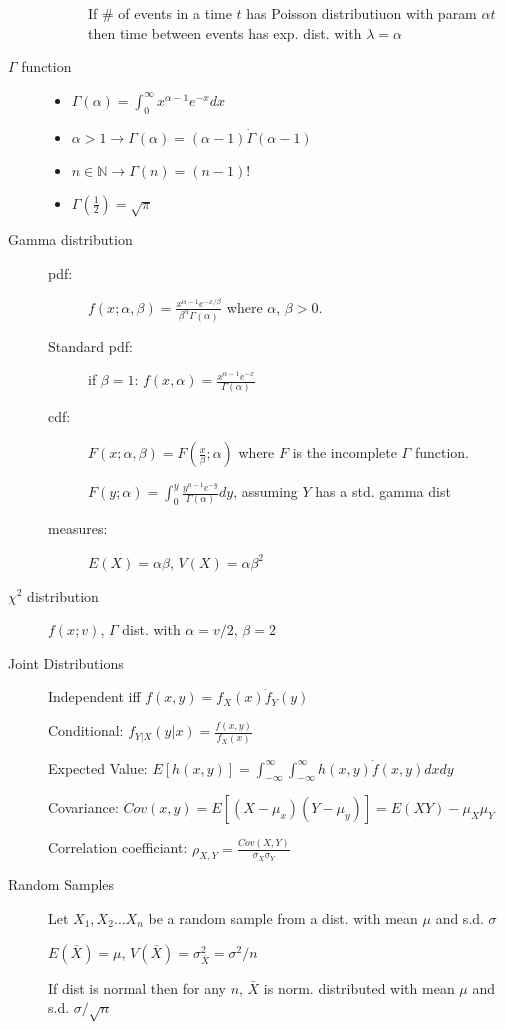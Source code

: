 \documentclass[12pt]{letter}
\begin{document}
\begin{multicols}{2}
\begin{description}
\begin{description}
        If \# of events in a time $t$ has Poisson distributiuon with param $\alpha t$ then time between events has exp. dist. with $\lambda = \alpha$
    \end{description}
  \item[$\Gamma$ function]
    \begin{itemize}
    \item $\Gamma (\alpha) = \int_0^\infty x^{\alpha - 1}e^{-x}dx$ 
    \item $\alpha > 1 \rightarrow \Gamma(\alpha) = (\alpha - 1)\dot\Gamma(\alpha - 1)$
    \item $n \in \mathbb{N} \rightarrow \Gamma(n) = (n - 1)!$
    \item $\Gamma(\frac{1}{2}) = \sqrt{\pi}$
    \end{itemize}
  \item[Gamma distribution]
    \begin{description}
    \item[pdf:] $f(x; \alpha, \beta) = \frac{x^{\alpha - 1}e^{-x/\beta}}{\beta^\alpha \Gamma(\alpha)}$ where $\alpha$, $\beta > 0$.
    \item[Standard pdf:] if $\beta = 1$: $f(x, \alpha) = \frac{x^{\alpha - 1}e^{-x}}{\Gamma(\alpha)}$
    \item[cdf:] $F(x;\alpha, \beta) = F(\frac{x}{\beta};\alpha)$ where $F$ is the incomplete $\Gamma$ function.
      
      $F(y;\alpha) = \int_0^y \frac{y^{a-1}e^{-y}}{\Gamma(\alpha)}dy$, assuming $Y$ has a std. gamma dist
    \item[measures:] $E(X) = \alpha\beta$, $V(X) = \alpha\beta^2$
    \end{description}

  \item[$\chi^2$ distribution] $f(x;v)$, $\Gamma$ dist. with $\alpha = v/2$, $\beta=2$

  \item[Joint Distributions]
    Independent iff $f(x,y) = f_X(x) \dot f_Y(y)$

    Conditional: $f_{Y|X}(y|x) = \frac{f(x,y)}{f_X(x)}$

    Expected Value: $E[h(x,y)] = \int_{-\infty}^\infty \int_{-\infty}^\infty h(x,y)\dot f(x,y)dx dy$

    Covariance: $Cov(x,y) = E[(X-\mu_x)(Y-\mu_y)] = E(XY) - \mu_X\mu_Y$

    Correlation coefficiant: $\rho _{X,Y} = \frac{Cov(X,Y)}{\sigma_X\sigma_Y}$
  \item[Random Samples]
    Let $X_1,X_2\ldots X_n$ be a random sample from a dist. with mean $\mu$ and s.d. $\sigma$
    
    $E(\bar{X}) = \mu$, $V(\bar{X}) = \sigma_{\bar{X}}^2 = \sigma^2/n$
    
    If dist is normal then for any $n$,  $\bar{X}$ is norm. distributed with mean $\mu$ and s.d. $\sigma/\sqrt{n}$
\end{description}            
\end{multicols}
\end{document}

